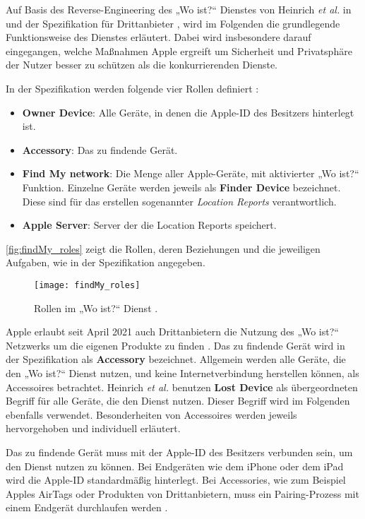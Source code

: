 Auf Basis des Reverse-Engineering des „Wo ist?“ Dienstes von Heinrich \textit{et al.} in \cite{Heinrich_FindMy} und der Spezifikation für Drittanbieter \cite{Apple_FindMySpec}, wird im Folgenden die grundlegende Funktionsweise des Dienstes erläutert.
Dabei wird insbesondere darauf eingegangen, welche Maßnahmen Apple ergreift um Sicherheit und Privatsphäre der Nutzer besser zu schützen als die konkurrierenden Dienste. 

In der Spezifikation werden folgende vier Rollen definiert \cite{Apple_FindMySpec}:
\begin{itemize}
    \item \textbf{Owner Device}: Alle Geräte, in denen die Apple-ID des Besitzers hinterlegt ist.
    \item \textbf{Accessory}: Das zu findende Gerät.
    \item \textbf{Find My network}: Die Menge aller Apple-Geräte, mit aktivierter „Wo ist?“ Funktion. Einzelne Geräte werden jeweils als \textbf{Finder Device} bezeichnet. Diese sind für das erstellen sogenannter \textit{Location Reports} verantwortlich.
    \item \textbf{Apple Server}: Server der die Location Reports speichert.
\end{itemize}
\autoref{fig:findMy_roles} zeigt die Rollen, deren Beziehungen und die jeweiligen Aufgaben, wie in der Spezifikation angegeben.
\begin{figure}
    \centering
    \texttt{[image: findMy\_roles]}
    \caption{Rollen im „Wo ist?“ Dienst \cite{Apple_FindMySpec}.}
    \label{fig:findMy_roles}
\end{figure}
Apple erlaubt seit April 2021 auch Drittanbietern die Nutzung des „Wo ist?“ Netzwerks um die eigenen Produkte zu finden \cite{Apple_FindMy3rdParty}.
Das zu findende Gerät wird in der Spezifikation als \textbf{Accessory} bezeichnet.
Allgemein werden alle Geräte, die den „Wo ist?“ Dienst nutzen, und keine Internetverbindung herstellen können, als Accessoires betrachtet.
Heinrich \textit{et al.} \cite{Heinrich_FindMy} benutzen \textbf{Lost Device} als übergeordneten Begriff für alle Geräte, die den Dienst nutzen.
Dieser Begriff wird im Folgenden ebenfalls verwendet.
Besonderheiten von Accessoires werden jeweils hervorgehoben und individuell erläutert.

Das zu findende Gerät muss mit der Apple-ID des Besitzers verbunden sein, um den Dienst nutzen zu können.
Bei Endgeräten wie dem iPhone oder dem iPad wird die Apple-ID standardmäßig hinterlegt.
Bei Accessories, wie zum Beispiel Apples AirTags oder Produkten von Drittanbietern, muss ein Pairing-Prozess mit einem Endgerät durchlaufen werden \cite{Apple_FindMySpec}.

